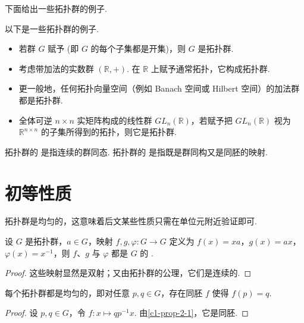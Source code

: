 下面给出一些拓扑群的例子.

\begin{examples}\label{c1-ex-1-3}
以下是一些拓扑群的例子.
\begin{itemize}
    \item 若群 $G$ 赋予 (即 $G$ 的每个子集都是开集)，则 $G$ 是拓扑群.
    \item 考虑带加法的实数群 $(\mathbb{R},+)$. 在 $\mathbb{R}$ 上赋予通常拓扑，它构成拓扑群.
    \item 更一般地，任何拓扑向量空间（例如 Banach 空间或 Hilbert 空间）的加法群都是拓扑群.
    \item 全体可逆 $n\times n$ 实矩阵构成的线性群 $GL_{n}(\mathbb{R})$，若赋予把 $GL_{n}(\mathbb{R})$ 视为 $\mathbb{R}^{n\times n}$ 的子集所得到的拓扑，则它是拓扑群.
\end{itemize}
\end{examples}

\begin{definition}\label{c1-def-1-4}
拓扑群的  是指连续的群同态. 拓扑群的  是指既是群同构又是同胚的映射.
\end{definition}

\section{初等性质}

拓扑群是均匀的，这意味着后文某些性质只需在单位元附近验证即可.

\begin{proposition}\label{c1-prop-2-1}
设 $G$ 是拓扑群，$a\in G$，映射 $f,g,\varphi:G\to G$ 定义为 $f(x)=xa$，$g(x)=ax$，$\varphi(x)=x^{-1}$，则 $f$、$g$ 与 $\varphi$ 都是 $G$ 的 .
\end{proposition}

\begin{proof}
这些映射显然是双射；又由拓扑群的公理，它们是连续的.
\end{proof}

\begin{proposition}\label{c1-prop-2-2}
每个拓扑群都是均匀的，即对任意 $p,q\in G$，存在同胚 $f$ 使得 $f(p)=q$.
\end{proposition}

\begin{proof}
设 $p,q\in G$，令 $f:x\mapsto qp^{-1}x$. 由\autoref{c1-prop-2-1}，它是同胚.
\end{proof}

